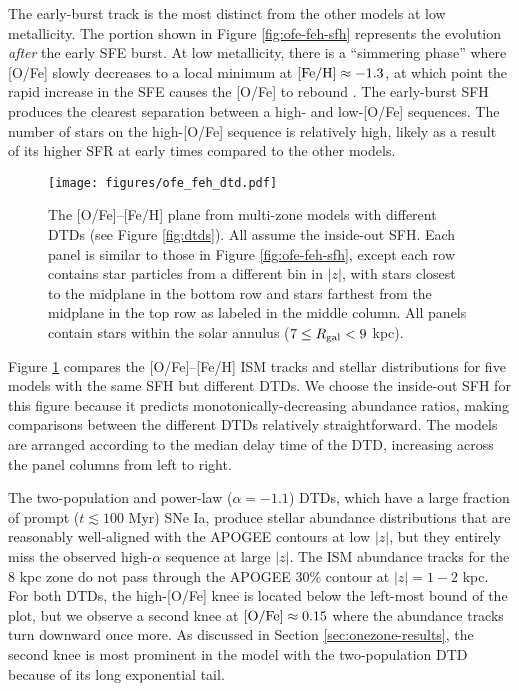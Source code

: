 \documentclass[twocolumn,twocolappendix]{aastex631}
\begin{document}
The early-burst track is the most distinct from the other models at low metallicity. The portion shown in Figure \ref{fig:ofe-feh-sfh} represents the evolution {\it after} the early SFE burst. At low metallicity, there is a ``simmering phase'' where [O/Fe] slowly decreases to a local minimum at ${\rm [Fe/H]}\approx-1.3$, at which point the rapid increase in the SFE causes the [O/Fe] to rebound \citep[a more thorough examination of this behavior can be found in][]{Conroy2022-ThickDisk}.
The early-burst SFH produces the clearest separation between a high- and low-[O/Fe] sequences. The number of stars on the high-[O/Fe] sequence is relatively high, likely as a result of its higher SFR at early times compared to the other models.

\begin{figure*}
    \centering
    \texttt{[image: figures/ofe\_feh\_dtd.pdf]}
    \caption{The [O/Fe]--[Fe/H] plane from multi-zone models with different DTDs (see Figure \ref{fig:dtds}). All assume the inside-out SFH. Each panel is similar to those in Figure \ref{fig:ofe-feh-sfh}, except each row contains star particles from a different bin in $|z|$, with stars closest to the midplane in the bottom row and stars farthest from the midplane in the top row as labeled in the middle column. All panels contain stars within the solar annulus ($7\leq R_{\rm gal}<9$ kpc).}
    \label{fig:ofe-feh-dtd}
\end{figure*}

Figure \ref{fig:ofe-feh-dtd} compares the [O/Fe]--[Fe/H] ISM tracks and stellar distributions for five models with the same SFH but different DTDs. We choose the inside-out SFH for this figure because it predicts monotonically-decreasing abundance ratios, making comparisons between the different DTDs relatively straightforward. The models are arranged according to the median delay time of the DTD, increasing across the panel columns from left to right. 

The two-population and power-law ($\alpha=-1.1$) DTDs, which have a large fraction of prompt ($t\lesssim100$ Myr) SNe Ia, produce stellar abundance distributions that are reasonably well-aligned with the APOGEE contours at low $|z|$, but they entirely miss the observed high-$\alpha$ sequence at large $|z|$. The ISM abundance tracks for the 8 kpc zone do not pass through the APOGEE 30\% contour at $|z|=1-2$ kpc. For both DTDs, the high-[O/Fe] knee is located below the left-most bound of the plot, but we observe a second knee at ${\rm [O/Fe]}\approx0.15$ where the abundance tracks turn downward once more. As discussed in Section \ref{sec:onezone-results}, the second knee is most prominent in the model with the two-population DTD because of its long exponential tail.
\end{document}
